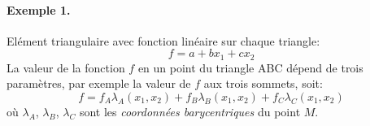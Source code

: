 \begin{figure}[htp]
\centering
{}\quad
{}\quad
{}
\end{figure}

\paragraph{Exemple 1.}
Elément triangulaire avec fonction linéaire sur chaque triangle: 
\[
f = a +b x_1+cx_2
\]
La valeur de la fonction $f$ en un point du triangle ABC dépend de trois paramètres, par exemple la valeur de $f$ aux trois sommets, soit: 
\begin{equation}
    f = f_A \lambda_A (x_1,x_2) + f_B \lambda_B (x_1,x_2) + f_C \lambda_C (x_1, x_2)
    \label{eq:Ch09-064}
\end{equation}
où $\lambda_A$, $\lambda_B$, $\lambda_C$ sont les \emph{coordonnées barycentriques} du point $M$. 

